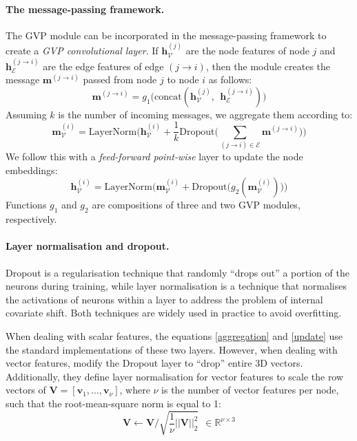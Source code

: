 \paragraph{The message-passing framework.} The GVP module can be incorporated in the message-passing framework to create a \textit{GVP convolutional layer}. If $\mathbf{h}_{\mathcal{V}}^{(j)}$ are the node features of node $j$ and $\mathbf{h}_{\mathcal{E}}^{(j\rightarrow i)}$ are the edge features of edge $(j \rightarrow i)$, then the module creates the message $\mathbf{m}^{(j\rightarrow i)}$ passed from node $j$ to node $i$ as follows:
\begin{equation}
\mathbf{m}^{(j\rightarrow i)} = g_1\Big(\text{concat}(\mathbf{h}_{\mathcal{V}}^{(j)}, ~~\mathbf{h}_{\mathcal{E}}^{(j \rightarrow i)})\Big) 
\end{equation}
Assuming $k$ is the number of incoming messages, we aggregate them according to:
\begin{equation}
\mathbf{m}_{\mathcal{V}}^{(i)}= \text{LayerNorm}\Big(\mathbf{h}_{\mathcal{V}}^{(i)} + \frac{1}{k}\text{Dropout}\big(\sum_{(j \rightarrow i)\in\mathcal{E}}\mathbf{m}^{(j\rightarrow i)}\big)\Big)
\label{aggregation}
\end{equation}
We follow this with a \textit{feed-forward point-wise} layer to update the node embeddings:
\begin{equation}
    \mathbf{h}_{\mathcal{V}}^{(i)}= \text{LayerNorm}\Big(\mathbf{m}_{\mathcal{V}}^{(i)} + \text{Dropout}\big(g_2(\mathbf{m}_{\mathcal{V}}^{(i)})\big)\Big)
\label{update}
\end{equation}
Functions $g_1$ and $g_2$ are compositions of three and two GVP modules, respectively.

\paragraph{Layer normalisation and dropout.} Dropout \cite{dropout} is a regularisation technique that randomly ``drops out'' a portion of the neurons during training, while layer normalisation \cite{layernorm} is a technique that normalises the activations of neurons within a layer to address the problem of internal covariate shift. Both techniques are widely used in practice to avoid overfitting. 

When dealing with scalar features, the equations \ref{aggregation} and \ref{update} use the standard implementations of these two layers. However, when dealing with vector features, \citet{gvp1} modify the Dropout layer to ``drop'' entire 3D vectors. Additionally, they define layer normalisation for vector features to scale the row vectors of $\mathbf{V} =[\mathbf{v}_1, \dots, \mathbf{v}_{\nu}]$, where $\nu$ is the number of vector features per node, such that the root-mean-square norm is equal to 1: 
\begin{equation}
    \mathbf{V} \leftarrow \mathbf{V}/\sqrt{\frac{1}{\nu}||\mathbf{V}||_2^2} ~~\in \mathbb{R}^{\nu\times 3}  
\end{equation}



